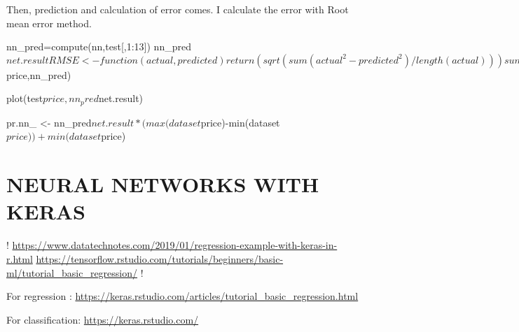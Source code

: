 \documentclass[
]{article}
\begin{document}
Then, prediction and calculation of error comes. I calculate the error
with Root mean error method.

nn\_pred=compute(nn,test{[},1:13{]})
nn\_pred\(net.resultRMSE <- function(actual,predicted) {  return(sqrt(sum(actual^2-predicted^2)/length(actual))) } summary(nn_pred) nn_pred <- is.numeric(nn_pred) RMSE(test\)price,nn\_pred)

plot(test\(price,nn_pred\)net.result)

pr.nn\_ \textless-
nn\_pred\(net.result*(max(dataset\)price)-min(dataset\(price))+min(dataset\)price)

\hypertarget{neural-networks-with-keras}{%
\section{NEURAL NETWORKS WITH KERAS}\label{neural-networks-with-keras}}

!
\url{https://www.datatechnotes.com/2019/01/regression-example-with-keras-in-r.html}
\url{https://tensorflow.rstudio.com/tutorials/beginners/basic-ml/tutorial_basic_regression/}
!

For regression :
\url{https://keras.rstudio.com/articles/tutorial_basic_regression.html}

For classification: \url{https://keras.rstudio.com/}
\end{document}
